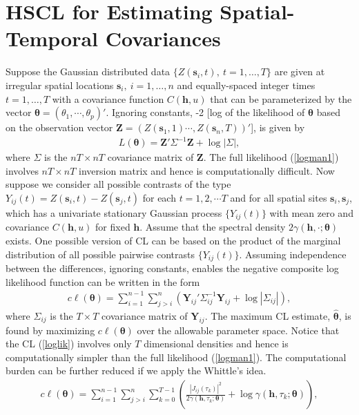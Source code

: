 \documentclass[twoside]{article}
\renewcommand{\/}[1]{\mathbf{\boldsymbol{#1}}}
\begin{document}
\section{ HSCL for Estimating  Spatial-Temporal Covariances}\label{sec3}
 Suppose the Gaussian distributed data $\{Z(\/s_i,t),\ t=1, \ldots, T\}$ are given at
irregular spatial locations $\/s_i,\ i=1, \ldots, n$ and equally-spaced integer
times $t=1, \ldots, T$ with a covariance function $C(\/h,u)$ that can be parameterized by the vector $\/\theta=(\theta_1, \cdots , \theta_p)'$.
 Ignoring constants, -2 [log of the likelihood of $\/\theta $ based on the observation vector $\/Z= (Z(\/s_1, 1) \cdots, Z(\/s_n, T))'$], is
given by
\begin{eqnarray}\label{logman1}
L(\/\theta)=\/Z'\Sigma^{-1}\/Z+\log|\Sigma|,
\end{eqnarray}
where $\Sigma$ is the $nT\times nT$ covariance matrix of $\/Z$. The full likelihood (\ref{logman1}) involves  $nT\times nT$ inversion matrix and hence is computationally difficult.
 Now suppose we consider all possible contrasts of the type
$Y_{ij}(t)=Z(\/s_i,t)-Z(\/s_j,t)$
for each $ t=1, 2, \cdots T$ and for all spatial sites  $\/s_i,  \/s_j$, which has a univariate
stationary Gaussian process $\{ Y_{ij}(t)\}$ with mean zero and covariance $C(\/h,u)$ for fixed $\/h$. Assume  that the spectral density $2\gamma(\/h,\cdot ;\/\theta)$ exists. 
 One possible version of CL can be based on the product of the  marginal distribution of all possible pairwise contrasts  $\{ Y_{ij}(t)\}$.
Assuming independence between the differences, ignoring constants,  enables the negative composite log likelihood function can be written in the form
\begin{eqnarray}\label{loglik}
c\ell(\/\theta)=\sum_{i=1}^{n-1}\sum_{j>i}^{n}(\/Y_{ij}'\Sigma_{ij}^{-1}\/Y_{ij}+\log|\Sigma_{ij}|),
\end{eqnarray}
where $\Sigma_{ij}$ is the $T\times T$ covariance matrix of $\/Y_{ij}$. The maximum  CL
estimate, $\hat{\/\theta}$, is found by maximizing $c\ell(\/\theta)$ over the allowable parameter
space. Notice that the CL (\ref{loglik}) involves only $T$ dimensional densities and hence is computationally simpler than the full likelihood (\ref{logman1}).
The computational burden can be further reduced if we apply the Whittle's idea.
 \begin{eqnarray}\label{like}
c\ell(\/\theta)=\sum_{i=1}^{n-1}\sum_{j>i}^{n}\sum_{k=0}^{T-1}\left(\frac{|J_{ij}(\tau_k)|^2}{2\gamma(\/h,\tau_k; \/\theta)}+\log \gamma(\/h,\tau_k; \/\theta)\right),
\end{eqnarray}
\end{document}
